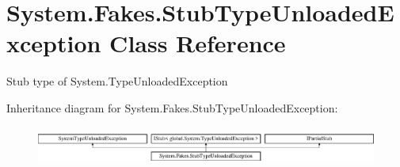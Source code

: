 \hypertarget{class_system_1_1_fakes_1_1_stub_type_unloaded_exception}{\section{System.\-Fakes.\-Stub\-Type\-Unloaded\-Exception Class Reference}
\label{class_system_1_1_fakes_1_1_stub_type_unloaded_exception}
}


Stub type of System.\-Type\-Unloaded\-Exception 


Inheritance diagram for System.\-Fakes.\-Stub\-Type\-Unloaded\-Exception\-:\begin{figure}[H]
\begin{center}
\leavevmode
\includegraphics[height=1.287356cm]{class_system_1_1_fakes_1_1_stub_type_unloaded_exception}
\end{center}
\end{figure}
